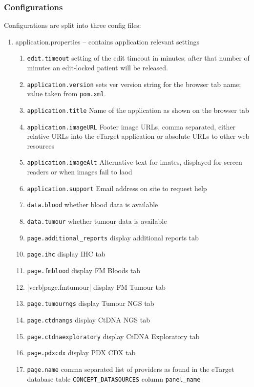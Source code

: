 \subsubsection{Configurations}

Configurations are split into three config files:
\begin{enumerate}
  \item application.properties -- contains application relevant settings
  	\begin{enumerate}
  	  \item \verb|edit.timeout| setting of the edit timeout in minutes; after that number of minutes an edit-locked patient will be released. 
  	  \item \verb|application.version| sets ver version string for the browser tab name; value taken from \verb|pom.xml|.
  	  \item \verb|application.title| Name of the application as shown on the browser tab
  	  \item \verb|application.imageURL| Footer image URLs, comma separated, either relative URLs into the eTarget application or absolute URLs to other web resources
  	  \item \verb|application.imageAlt| Alternative text for imates, displayed for screen readers or when images fail to laod
  	  \item \verb|application.support| Email address on site to request help
  	  \item \verb|data.blood| whether blood data is available
  	  \item \verb|data.tumour| whether tumour data is available
  	  \item \verb|page.additional_reports| display additional reports tab
  	  \item \verb|page.ihc| display IHC tab
  	  \item \verb|page.fmblood| display FM Bloods tab
  	  \item |verb|page.fmtumour| display FM Tumour tab
  	  \item \verb|page.tumourngs| display Tumour NGS tab
  	  \item \verb|page.ctdnangs| display CtDNA NGS tab
  	  \item \verb|page.ctdnaexploratory| display CtDNA Exploratory tab
  	  \item \verb|page.pdxcdx| display PDX CDX tab
  	  \item \verb|page.name| comma separated list of providers as found in the eTarget database table \verb|CONCEPT_DATASOURCES| column \verb|panel_name|

\end{enumerate}
\end{enumerate}
